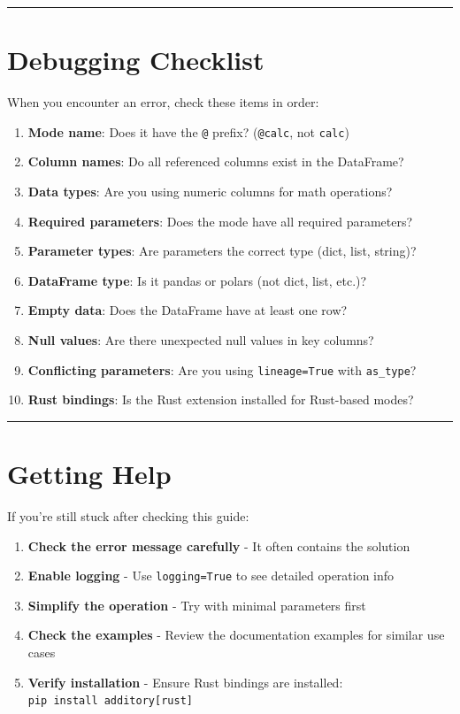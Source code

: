 \documentclass[
  letterpaper,
]{scrbook}
\providecommand{\tightlist}{%
  \setlength{\itemsep}{0pt}\setlength{\parskip}{0pt}}
\begin{document}
\begin{center}\rule{0.5\linewidth}{0.5pt}\end{center}

\section{Debugging Checklist}\label{debugging-checklist}

When you encounter an error, check these items in order:

\begin{enumerate}
\def\labelenumi{\arabic{enumi}.}
\tightlist
\item
  \textbf{Mode name}: Does it have the \texttt{@} prefix?
  (\texttt{@calc}, not \texttt{calc})
\item
  \textbf{Column names}: Do all referenced columns exist in the
  DataFrame?
\item
  \textbf{Data types}: Are you using numeric columns for math
  operations?
\item
  \textbf{Required parameters}: Does the mode have all required
  parameters?
\item
  \textbf{Parameter types}: Are parameters the correct type (dict, list,
  string)?
\item
  \textbf{DataFrame type}: Is it pandas or polars (not dict, list,
  etc.)?
\item
  \textbf{Empty data}: Does the DataFrame have at least one row?
\item
  \textbf{Null values}: Are there unexpected null values in key columns?
\item
  \textbf{Conflicting parameters}: Are you using \texttt{lineage=True}
  with \texttt{as\_type}?
\item
  \textbf{Rust bindings}: Is the Rust extension installed for Rust-based
  modes?
\end{enumerate}

\begin{center}\rule{0.5\linewidth}{0.5pt}\end{center}

\section{Getting Help}\label{getting-help}

If you're still stuck after checking this guide:

\begin{enumerate}
\def\labelenumi{\arabic{enumi}.}
\tightlist
\item
  \textbf{Check the error message carefully} - It often contains the
  solution
\item
  \textbf{Enable logging} - Use \texttt{logging=True} to see detailed
  operation info
\item
  \textbf{Simplify the operation} - Try with minimal parameters first
\item
  \textbf{Check the examples} - Review the documentation examples for
  similar use cases
\item
  \textbf{Verify installation} - Ensure Rust bindings are installed:
  \texttt{pip\ install\ additory{[}rust{]}}
\end{enumerate}
\end{document}
